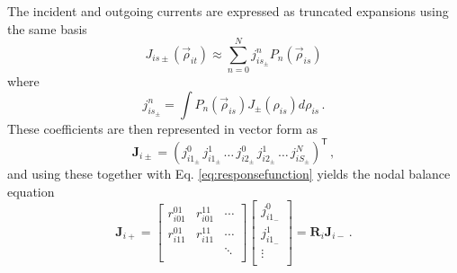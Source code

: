The incident and outgoing currents are expressed as
truncated expansions using the same basis
\begin{equation}
  J_{is\pm}(\vec{\rho}_{it}) \approx \sum^{N}_{n=0}  
    j^n_{is_\pm} P_n (\vec{\rho}_{is}) 
\end{equation}
where
\begin{equation}
      j^n_{is_\pm} = \int  P_n (\vec{\rho}_{is}) 
        J_{\pm} (\rho_{is}) d \rho_{is} \, .
\end{equation}
These coefficients are then represented in vector form as
\begin{equation}
  \mathbf{J}_{i\pm} = ( j^0_{i1_\pm} \, j^1_{i1_\pm} \, \ldots \, 
    j^0_{i2_\pm} \, j^1_{i2_\pm} \, \ldots \, j^N_{iS_\pm} )^\mathsf{T} \, ,
\end{equation}
and using these together with Eq. \ref{eq:responsefunction} yields
the nodal balance equation
\begin{equation}
    \mathbf{J}_{i+} = 
     \left [\begin{array}{ccc}
       r^{01}_{i01} &  r^{11}_{i01}  &  \cdots   \\
       r^{01}_{i11} &  r^{11}_{i11}  &  \cdots   \\
                    &                &  \ddots   \\
    \end{array} 
    \right ] \left [\begin{array}{c}
      j^0_{i1_-}       \\
      j^1_{i1_-}       \\
      \vdots           \\
    \end{array} 
    \right ] = \mathbf{R}_i\mathbf{J}_{i-} \, .
  \label{eq:elementresponse}
\end{equation}


